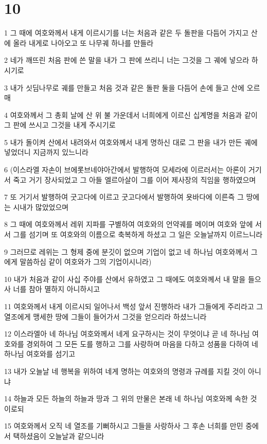 \chapter{10}

\par 1 그 때에 여호와께서 내게 이르시기를 너는 처음과 같은 두 돌판을 다듬어 가지고 산에 올라 내게로 나아오고 또 나무궤 하나를 만들라
\par 2 네가 깨뜨린 처음 판에 쓴 말을 내가 그 판에 쓰리니 너는 그것을 그 궤에 넣으라 하시기로
\par 3 내가 싯딤나무로 궤를 만들고 처음 것과 같은 돌판 둘을 다듬어 손에 들고 산에 오르매
\par 4 여호와께서 그 총회 날에 산 위 불 가운데서 너희에게 이르신 십계명을 처음과 같이 그 판에 쓰시고 그것을 내게 주시기로
\par 5 내가 돌이켜 산에서 내려와서 여호와께서 내게 명하신 대로 그 판을 내가 만든 궤에 넣었더니 지금까지 있느니라
\par 6 (이스라엘 자손이 브에롯브네야아간에서 발행하여 모세라에 이르러서는 아론이 거기서 죽고 거기 장사되었고 그 아들 엘르아살이 그를 이어 제사장의 직임을 행하였으며
\par 7 또 거기서 발행하여 굿고다에 이르고 굿고다에서 발행하여 욧바다에 이른즉 그 땅에는 시내가 많았었으며
\par 8 그 때에 여호와께서 레위 지파를 구별하여 여호와의 언약궤를 메이며 여호와 앞에 서서 그를 섬기며 또 여호와의 이름으로 축복하게 하셨고 그 일은 오늘날까지 이르느니라
\par 9 그러므로 레위는 그 형제 중에 분깃이 없으며 기업이 없고 네 하나님 여호와께서 그에게 말씀하심 같이 여호와가 그의 기업이시니라)
\par 10 내가 처음과 같이 사십 주야를 산에서 유하였고 그 때에도 여호와께서 내 말을 들으사 너를 참아 멸하지 아니하시고
\par 11 여호와께서 내게 이르시되 일어나서 백성 앞서 진행하라 내가 그들에게 주리라고 그 열조에게 맹세한 땅에 그들이 들어가서 그것을 얻으리라 하셨느니라
\par 12 이스라엘아 네 하나님 여호와께서 네게 요구하시는 것이 무엇이냐 곧 네 하나님 여호와를 경외하여 그 모든 도를 행하고 그를 사랑하며 마음을 다하고 성품을 다하여 네 하나님 여호와를 섬기고
\par 13 내가 오늘날 네 행복을 위하여 네게 명하는 여호와의 명령과 규례를 지킬 것이 아니냐
\par 14 하늘과 모든 하늘의 하늘과 땅과 그 위의 만물은 본래 네 하나님 여호와께 속한 것이로되
\par 15 여호와께서 오직 네 열조를 기뻐하시고 그들을 사랑하사 그 후손 너희를 만민 중에서 택하셨음이 오늘날과 같으니라
